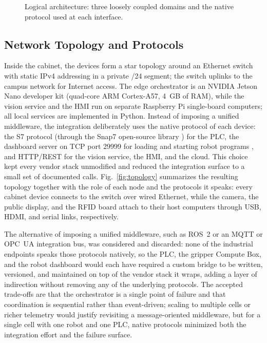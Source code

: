 \documentclass[conference]{IEEEtran}
\begin{document}
\begin{figure}[!t]
\caption{Logical architecture: three loosely coupled domains and the native protocol used at each interface.}
\label{fig:architecture}
\end{figure}

\subsection{Network Topology and Protocols}
Inside the cabinet, the devices form a star topology around an Ethernet switch with static IPv4 addressing in a private /24 segment; the switch uplinks to the campus network for Internet access. The edge orchestrator is an NVIDIA Jetson Nano developer kit (quad-core ARM Cortex-A57, 4~GB of RAM), while the vision service and the HMI run on separate Raspberry Pi single-board computers; all local services are implemented in Python.
Instead of imposing a unified middleware, the integration deliberately uses the native protocol of each device: the S7 protocol (through the Snap7 open-source library \cite{b13}) for the PLC, the dashboard server on TCP port 29999 for loading and starting robot programs \cite{b14}, and HTTP/REST for the vision service, the HMI, and the cloud. This choice kept every vendor stack unmodified and reduced the integration surface to a small set of documented calls. Fig.~\ref{fig:topology} summarizes the resulting topology together with the role of each node and the protocols it speaks: every cabinet device connects to the switch over wired Ethernet, while the camera, the public display, and the RFID board attach to their host computers through USB, HDMI, and serial links, respectively.

The alternative of imposing a unified middleware, such as ROS~2 \cite{b16} or an MQTT or OPC~UA integration bus, was considered and discarded: none of the industrial endpoints speaks those protocols natively, so the PLC, the gripper Compute Box, and the robot dashboard would each have required a custom bridge to be written, versioned, and maintained on top of the vendor stack it wraps, adding a layer of indirection without removing any of the underlying protocols. The accepted trade-offs are that the orchestrator is a single point of failure and that coordination is sequential rather than event-driven; scaling to multiple cells or richer telemetry would justify revisiting a message-oriented middleware, but for a single cell with one robot and one PLC, native protocols minimized both the integration effort and the failure surface.
\end{document}
